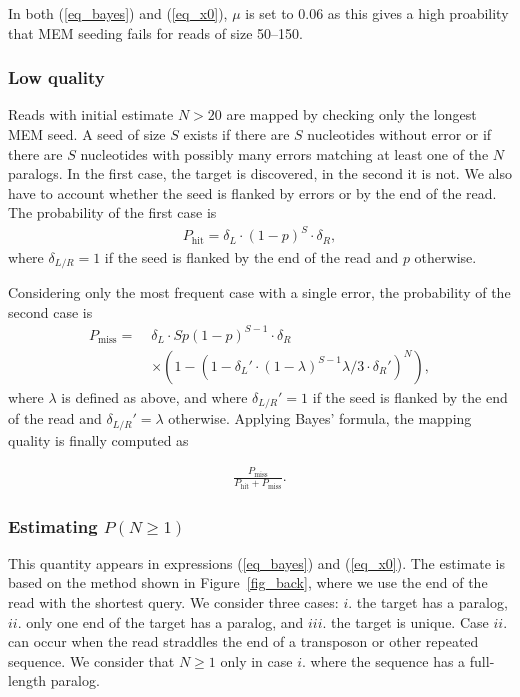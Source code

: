\documentclass[a4,center,fleqn]{NAR}
\begin{document}
In both (\ref{eq_bayes}) and (\ref{eq_x0}), $\mu$ is set to 0.06 as this
gives a high proability that MEM seeding fails for reads of size 50--150.


\subsubsection{Low quality} Reads with initial estimate $N > 20$ are
mapped by checking only the longest MEM seed. A seed of size $S$ exists if
there are $S$ nucleotides without error or if there are $S$ nucleotides
with possibly many errors matching at least one of the $N$ paralogs. In the
first case, the target is discovered, in the second it is not. We also have
to account whether the seed is flanked by errors or by the end of the read.
The probability of the first case is
\begin{align*}
P_{\text{hit}} = \delta_L \cdot (1-p)^S \cdot \delta_R,
\end{align*}
where $\delta_{L/R} = 1$ if the seed is flanked by the end of the read and
$p$ otherwise.

Considering only the most frequent case with a single error, the probability
of the second case is
\begin{equation*}
\begin{split}
P_{\text{miss}} = \; &\delta_L \cdot Sp(1-p)^{S-1} \cdot \delta_R  \\
   &\times \left(1- \left( 1-\delta_L' \cdot(1-\lambda)^{S-1}\lambda/3
   \cdot \delta_R'\right)^N \right),
\end{split}
\end{equation*}
where $\lambda$ is defined as above, and where $\delta_{L/R}' = 1$ if the
seed is flanked by the end of the read and $\delta_{L/R}' = \lambda$ otherwise.
Applying Bayes' formula, the mapping quality is finally computed as

\begin{align}
\label{eq_low}
\frac{P_{\text{miss}}}{P_{\text{hit}} + P_{\text{miss}}}.
\end{align}

\subsubsection{Estimating $P(N \geq 1)$} This quantity appears in
expressions (\ref{eq_bayes}) and (\ref{eq_x0}). The estimate is based on
the method shown in Figure~\ref{fig_back}, where we use the end of the
read with the shortest query. We consider three cases: $i.$ the target has
a paralog, $ii.$ only one end of the target has a paralog, and $iii.$ the
target is unique. Case $ii.$ can occur when the read straddles the end of
a transposon or other repeated sequence. We consider that $N \geq 1$ only
in case $i.$ where the sequence has a full-length paralog.
\end{document}
